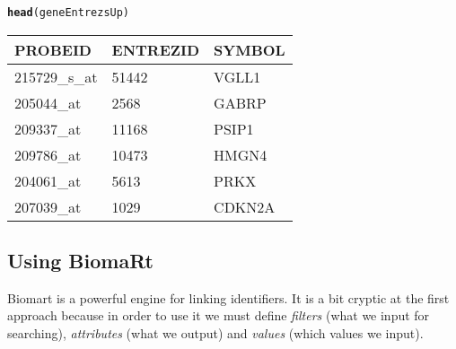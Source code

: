 \documentclass{article}\usepackage[]{graphicx}\usepackage[]{color}
\makeatletter
\newcommand{\hlstd}[1]{\textcolor[rgb]{0.345,0.345,0.345}{#1}}%
\newcommand{\hlkwd}[1]{\textcolor[rgb]{0.737,0.353,0.396}{\textbf{#1}}}%
\newenvironment{kframe}{%
 \def\at@end@of@kframe{}%
 \ifinner\ifhmode%
  \def\at@end@of@kframe{\end{minipage}}%
  \begin{minipage}{\columnwidth}%
 \fi\fi%
 \def\FrameCommand##1{\hskip\@totalleftmargin \hskip-\fboxsep
 \colorbox{shadecolor}{##1}\hskip-\fboxsep
     \hskip-\linewidth \hskip-\@totalleftmargin \hskip\columnwidth}%
 \MakeFramed {\advance\hsize-\width
   \@totalleftmargin\z@ \linewidth\hsize
   \@setminipage}}%
 {\par\unskip\endMakeFramed%
 \at@end@of@kframe}
\newenvironment{knitrout}{}{} %
\makeatother
\begin{document}
\begin{knitrout}
\begin{kframe}
{\ttfamily\noindent\itshape\color{messagecolor}{\#\# 'select()' returned 1:1 mapping between keys and columns}}\begin{alltt}
\hlkwd{head}\hlstd{(geneEntrezsUp)}
\end{alltt}
\end{kframe}


\begin{tabular}{l|l|l}
\hline
PROBEID & ENTREZID & SYMBOL\\
\hline
215729\_s\_at & 51442 & VGLL1\\
\hline
205044\_at & 2568 & GABRP\\
\hline
209337\_at & 11168 & PSIP1\\
\hline
209786\_at & 10473 & HMGN4\\
\hline
204061\_at & 5613 & PRKX\\
\hline
207039\_at & 1029 & CDKN2A\\
\hline
\end{tabular}
\end{knitrout}

\subsection{Using BiomaRt}

Biomart is a powerful engine for linking identifiers.
It is a bit cryptic at the first approach because in order to use it we must define \emph{filters} (what we input for searching), \emph{attributes} (what we output) and \emph{values} (which values we input).
\end{document}
